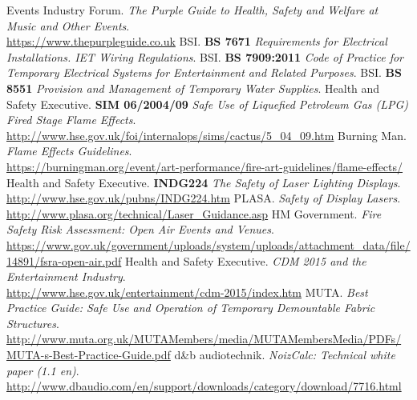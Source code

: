 \restoregeometry
\newpage
\begin{thebibliography}{9}
    Events Industry Forum.
    \textit{The Purple Guide to Health, Safety and Welfare at Music and Other Events}. \\
    \href{https://www.thepurpleguide.co.uk}{https://www.thepurpleguide.co.uk}
    BSI.
    \textbf{BS 7671} \textit{Requirements for Electrical Installations. IET Wiring Regulations}.
    BSI.
    \textbf{BS 7909:2011} \textit{Code of Practice for Temporary Electrical Systems for Entertainment and Related Purposes}.
    BSI.
    \textbf{BS 8551} \textit{Provision and Management of Temporary Water Supplies}.
    Health and Safety Executive.
    \textbf{SIM 06/2004/09} \textit{Safe Use of Liquefied Petroleum Gas (LPG) Fired Stage Flame Effects}. \\
    \href{http://www.hse.gov.uk/foi/internalops/sims/cactus/5\_04\_09.htm}{http://www.hse.gov.uk/foi/internalops/sims/cactus/5\_04\_09.htm}
    Burning Man.
    \textit{Flame Effects Guidelines}. \\
    \href{https://burningman.org/event/art-performance/fire-art-guidelines/flame-effects/}{https://burningman.org/event/art-performance/fire-art-guidelines/flame-effects/}
    Health and Safety Executive.
    \textbf{INDG224} \textit{The Safety of Laser Lighting Displays}. \\
        \href{http://www.hse.gov.uk/pubns/INDG224.htm}{http://www.hse.gov.uk/pubns/INDG224.htm}
    PLASA.
    \textit{Safety of Display Lasers}. \\
    \href{http://www.plasa.org/technical/Laser\_Guidance.asp}{http://www.plasa.org/technical/Laser\_Guidance.asp}
    HM Government.
    \textit{Fire Safety Risk Assessment: Open Air Events and Venues}. \\
    \href{https://www.gov.uk/government/uploads/system/uploads/attachment\_data/file/14891/fsra-open-air.pdf}{https://www.gov.uk/government/uploads/system/uploads/attachment\_data/file/14891/fsra-open-air.pdf}
    Health and Safety Executive.
    \textit{CDM 2015 and the Entertainment Industry}. \\
    \href{http://www.hse.gov.uk/entertainment/cdm-2015/index.htm}{http://www.hse.gov.uk/entertainment/cdm-2015/index.htm}
    MUTA.
    \textit{Best Practice Guide: Safe Use and Operation of Temporary Demountable Fabric Structures}. \\
    \href{http://www.muta.org.uk/MUTAMembers/media/MUTAMembersMedia/PDFs/MUTA-s-Best-Practice-Guide.pdf}{http://www.muta.org.uk/MUTAMembers/media/MUTAMembersMedia/PDFs/MUTA-s-Best-Practice-Guide.pdf}
    d\&b audiotechnik.
        \textit{NoizCalc: Technical white paper (1.1 en)}. \\
    \href{http://www.dbaudio.com/en/support/downloads/category/download/7716.html}{http://www.dbaudio.com/en/support/downloads/category/download/7716.html}
\end{thebibliography}
